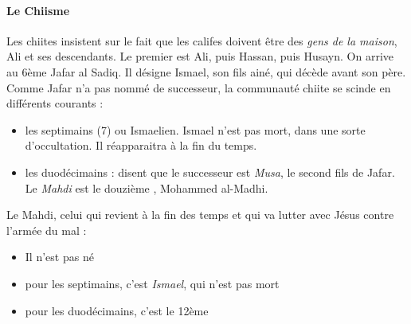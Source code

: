\paragraph{Le Chiisme} Les chiites insistent sur le fait que les califes doivent être des \textit{gens de la maison}, Ali et ses descendants. Le premier \Imam est Ali, puis Hassan, puis Husayn. On arrive au 6ème \Imam Jafar al Sadiq. Il désigne Ismael, son fils ainé, qui décède avant son père. Comme Jafar n'a pas nommé de successeur, la communauté chiite se scinde en différents courants : 
\begin{itemize}
\item les septimains (7) ou Ismaelien. Ismael n'est pas mort, dans une sorte d'occultation. Il réapparaitra à la fin du temps.  
\item les duodécimains : disent que le successeur est \textit{Musa}, le second fils de Jafar. Le \textit{Mahdi} est le douzième \Imam, Mohammed al-Madhi.
\end{itemize}

\begin{Def}[Mahdi]
Le Mahdi, celui qui revient à la fin des temps et qui va lutter avec Jésus contre l'armée du mal :
\begin{itemize}
\item Il n'est pas né
\item pour les septimains, c'est \textit{Ismael}, qui n'est pas mort
\item pour les duodécimains, c'est le 12ème \Imam
\end{itemize}
\end{Def}

